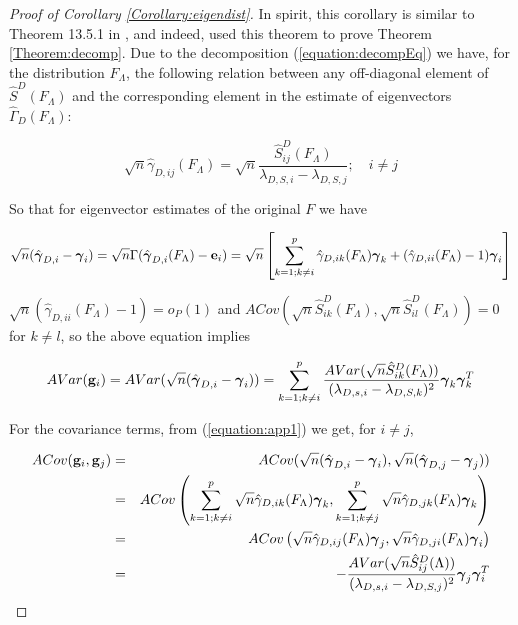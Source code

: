\documentclass[fleqn,11pt]{article}
\begin{document}
\begin{proof}[Proof of Corollary \ref{Corollary:eigendist}]
In spirit, this corollary is similar to Theorem 13.5.1 in \cite{anderson}, and indeed, \cite{taskinen12} used this theorem to prove Theorem \ref{Theorem:decomp}. Due to the decomposition (\ref{equation:decompEq}) we have, for the distribution $F_\Lambda$, the following relation between any off-diagonal element of $\hat S^D(F_\Lambda)$ and the corresponding element in the estimate of eigenvectors $\hat\Gamma_D (F_\Lambda)$:

$$ \sqrt n \hat\gamma_{D,ij} (F_\Lambda) = \sqrt n \frac{\hat S^D_{ij} (F_\Lambda)}{\lambda_{D,S,i} - \lambda_{D,S,j}}; \quad i \neq j$$

So that for eigenvector estimates of the original $F$ we have

\begin{equation} \label{equation:app1}
\sqrt n (\hat{{\boldsymbol{\gamma}}}_{D,i} - {\boldsymbol{\gamma}}_i) = \sqrt n \Gamma (\hat {{\boldsymbol{\gamma}}}_{D,i}(F_\Lambda) - {\bf{e}}_i ) = \sqrt n \left[ \sum_{k=1; k \neq i}^p \hat \gamma_{D,ik}(F_\Lambda){\boldsymbol{\gamma}}_k + (\hat \gamma_{D,ii}(F_\Lambda) - 1){\boldsymbol{\gamma}}_i \right]
\end{equation}

$\sqrt n (\hat \gamma_{D,ii}(F_\Lambda) - 1) =  o_P(1)$ and $ACov(\sqrt n \hat S^D_{ik}(F_\Lambda), \sqrt n \hat S^D_{il}(F_\Lambda)) = 0$ for $k \neq l$, so the above equation implies

$$ AVar({\bf{g}}_i) = AVar (\sqrt n (\hat{{\boldsymbol{\gamma}}}_{D,i} - {\boldsymbol{\gamma}}_i)) = \sum_{k=1; k \neq i}^p \frac{AVar(\sqrt n \hat S^D_{ik}(F_\Lambda))}{(\lambda_{D,s,i} - \lambda_{D,S,k})^2} {\boldsymbol{\gamma}}_k {\boldsymbol{\gamma}}_k^T $$

For the covariance terms, from (\ref{equation:app1}) we get, for $i \neq j$,

\begin{eqnarray*}
ACov({\bf{g}}_i, {\bf{g}}_j) &=& ACov (\sqrt n (\hat{{\boldsymbol{\gamma}}}_{D,i} - {\boldsymbol{\gamma}}_i), \sqrt n (\hat{{\boldsymbol{\gamma}}}_{D,j} - {\boldsymbol{\gamma}}_j))\\
&=& ACov \left( \sum_{k=1; k \neq i}^p \sqrt n \hat \gamma_{D,ik}(F_\Lambda){\boldsymbol{\gamma}}_k, \sum_{k=1; k \neq j}^p \sqrt n \hat \gamma_{D,jk}(F_\Lambda){\boldsymbol{\gamma}}_k \right)\\
&=& ACov \left( \sqrt n \hat \gamma_{D,ij}(F_\Lambda){\boldsymbol{\gamma}}_j, \sqrt n \hat \gamma_{D,ji}(F_\Lambda){\boldsymbol{\gamma}}_i \right)\\
&=& - \frac{AVar(\sqrt n \hat S^D_{ij}(\Lambda))}{(\lambda_{D,s,i} - \lambda_{D,S,j})^2} {\boldsymbol{\gamma}}_j {\boldsymbol{\gamma}}_i^T
\end{eqnarray*}


\end{proof}
\end{document}
